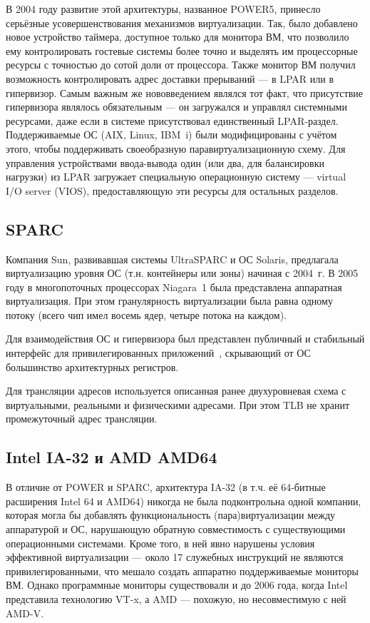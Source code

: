 В 2004 году развитие этой архитектуры, названное POWER5, принесло серьёзные усовершенствования механизмов виртуализации. Так, было добавлено новое устройство таймера, доступное только для монитора ВМ, что позволило ему контролировать гостевые системы более точно и выделять им процессорные ресурсы с точностью до сотой доли от процессора. Также монитор ВМ получил возможность контролировать адрес доставки прерываний --- в LPAR или в гипервизор. Самым важным же нововведением являлся тот факт, что присутствие гипервизора являлось обязательным --- он загружался и управлял системными ресурсами, даже если в системе присутствовал единственный LPAR-раздел. Поддерживаемые ОС (AIX, Linux, IBM~i) были модифицированы с учётом этого, чтобы поддерживать своеобразную паравиртуализационную схему. Для управления устройствами ввода-вывода один (или два, для балансировки нагрузки) из LPAR загружает специальную операционную систему --- virtual I/O server (VIOS), предоставляющую эти ресурсы для остальных разделов.

\subsection{SPARC}

Компания Sun, развивавшая системы UltraSPARC и ОС Solaris, предлагала виртуализацию уровня ОС (т.н. контейнеры или зоны) начиная с 2004~г. В 2005 году в многопоточных процессорах Niagara~1 была представлена аппаратная виртуализация. При этом гранулярность виртуализации была равна одному потоку (всего чип имел восемь ядер, четыре потока на каждом). 

Для взаимодействия ОС и гипервизора был представлен публичный и стабильный интерфейс для привилегированных приложений~\cite{sun4v-spec}, скрывающий от ОС большинство архитектурных регистров.

Для трансляции адресов используется описанная ранее двухуровневая схема с виртуальными, реальными и физическими адресами. При этом TLB не хранит промежуточный адрес трансляции. 

\subsection{Intel IA-32 и AMD AMD64}

В отличие от POWER и SPARC, архитектура IA-32 (в т.ч. её 64-битные расширения Intel 64 и AMD64) никогда не была подконтрольна одной компании, которая могла бы добавлять функциональность (пара)виртуализации между аппаратурой и ОС, нарушающую обратную совместимость с существующими операционными системами. Кроме того, в ней явно нарушены условия эффективной виртуализации --- около 17 служебных инструкций не являются привилегированными, что мешало создать аппаратно поддерживаемые мониторы ВМ. Однако программные мониторы существовали и до 2006 года, когда Intel представила технологию VT-x, а AMD --- похожую, но несовместимую с ней AMD-V. 


